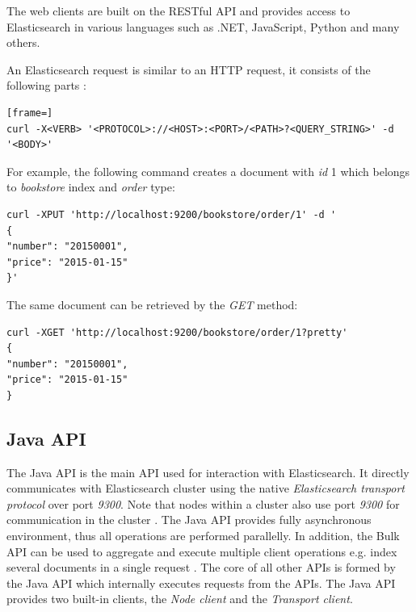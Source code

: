 \documentclass[12pt,oneside]{fithesis2}
\begin{document}
The web clients are built on the RESTful API and provides access to Elasticsearch in various languages such as .NET, JavaScript, Python and many others.

An Elasticsearch request is similar to an HTTP request, it consists of the following parts \cite[Talking to Elasticsearch]{elasticsearch_defnitive_guide}:

\begin{lstlisting}[frame=]
curl -X<VERB> '<PROTOCOL>://<HOST>:<PORT>/<PATH>?<QUERY_STRING>' -d '<BODY>'
\end{lstlisting}

For example, the following command creates a document with \textit{id} 1 which belongs to \textit{bookstore} index and \textit{order} type:

\begin{lstlisting}[caption = Example of indexing data in Elasticsearch, label = elastic_xput]
curl -XPUT 'http://localhost:9200/bookstore/order/1' -d '
{ 
"number": "20150001", 
"price": "2015-01-15"
}'
\end{lstlisting}

The same document can be retrieved by the \textit{GET} method:
\begin{lstlisting}[caption = Example of retrieving data from Elasticsearch, label = elastic_xget]
curl -XGET 'http://localhost:9200/bookstore/order/1?pretty'
{ 
"number": "20150001", 
"price": "2015-01-15"
}
\end{lstlisting}

\subsection{Java API}
The Java API is the main API used for interaction with Elasticsearch. It directly communicates with Elasticsearch cluster using the native \textit{Elasticsearch transport protocol} over port \textit{9300}. Note that nodes within a cluster also use port \textit{9300} for communication in the cluster \cite[Talking to Elasticsearch]{elasticsearch_defnitive_guide}. The Java API provides fully asynchronous environment, thus all operations are performed parallelly. In addition, the Bulk API can be used to aggregate and execute multiple client operations e.g. index several documents in a single request \cite[Java API]{elasticsearch_java_api_doc}. The core of all other APIs \cite{elasticsearch_doc} is formed by the Java API which internally executes requests from the APIs. The Java API provides two built-in clients, the \textit{Node client} and the \textit{Transport client}.
\end{document}
